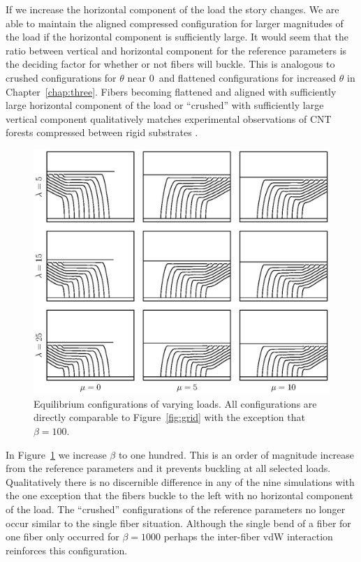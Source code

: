 \enlargethispage{-\baselineskip}
If we increase the horizontal component of the load the story changes. We are able to maintain the aligned compressed configuration for larger magnitudes of the load if the horizontal component is sufficiently large. It would seem that the ratio between vertical and horizontal component for the reference parameters is the deciding factor for whether or not fibers will buckle. This is analogous to crushed configurations for $\theta$ near $0$\textdegree\ and flattened configurations for increased $\theta$ in Chapter~\ref{chap:three}. Fibers becoming flattened and aligned with sufficiently large horizontal component of the load or ``crushed'' with sufficiently large vertical component qualitatively matches experimental observations of CNT forests compressed between rigid substrates \cite{Qu2008}.

	\begin{figure}
		\begin{center}
			\includegraphics[scale=1]{./fig/ch4/grid_b100.eps}
		\end{center}		
		\caption{Equilibrium configurations of varying loads. All configurations are directly comparable to Figure~\ref{fig:grid} with the exception that $\beta = 100$.
		\label{fig:grid_b100}}
	\end{figure}

	In Figure~\ref{fig:grid_b100} we increase $\beta$ to one hundred. This is an order of magnitude increase from the reference parameters and it prevents buckling at all selected loads. Qualitatively there is no discernible difference in any of the nine simulations with the one exception that the fibers buckle to the left with no horizontal component of the load. The ``crushed'' configurations of the reference parameters no longer occur similar to the single fiber situation. Although the single bend of a fiber for one fiber only occurred for $\beta=1000$ perhaps the inter-fiber vdW interaction reinforces this configuration.
	
